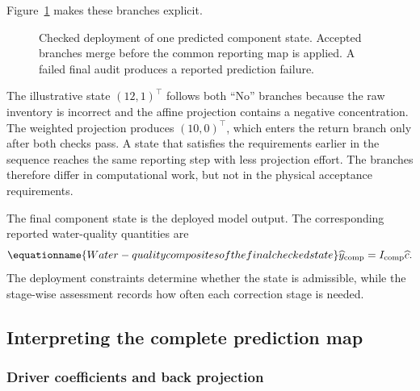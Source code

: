 Figure~\ref{fig:ch5_checked_deployment} makes these branches explicit.

\begin{figure}[htbp]
\centering

\caption{Checked deployment of one predicted component state. Accepted branches merge before the common reporting map is applied. A failed final audit produces a reported prediction failure.}
\label{fig:ch5_checked_deployment}
\end{figure}

The illustrative state \((12,1)^\top\) follows both ``No'' branches because the raw inventory is incorrect and the affine projection contains a negative concentration. The weighted projection produces \((10,0)^\top\), which enters the return branch only after both checks pass. A state that satisfies the requirements earlier in the sequence reaches the same reporting step with less projection effort. The branches therefore differ in computational work, but not in the physical acceptance requirements.

The final component state is the deployed model output. The corresponding reported water-quality quantities are
\begin{equation}
\equationname{Water-quality composites of the final checked state}
\label{eq:icsor_deployed_composites}
\widehat y_{\mathrm{comp}}=I_{\mathrm{comp}}\widehat c.
\end{equation}
The deployment constraints determine whether the state is admissible, while the stage-wise assessment records how often each correction stage is needed.

\subsection{Interpreting the complete prediction map}

\subsubsection{Driver coefficients and back projection}


